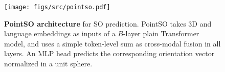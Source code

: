 \begin{figure}[t!]
  \begin{center}
  \texttt{[image: figs/src/pointso.pdf]}
  \vspace{-10pt}
  \caption{\textbf{PointSO architecture} for SO prediction.
  PointSO takes 3D and language embeddings as inputs of a $B$-layer plain Transformer model, and uses a simple token-level sum as cross-modal fusion in all layers.
  An MLP head predicts the corresponding orientation vector normalized in a unit sphere.
  } \label{fig:PointSO}
  \end{center}
  \vspace{-12pt}
\end{figure}
